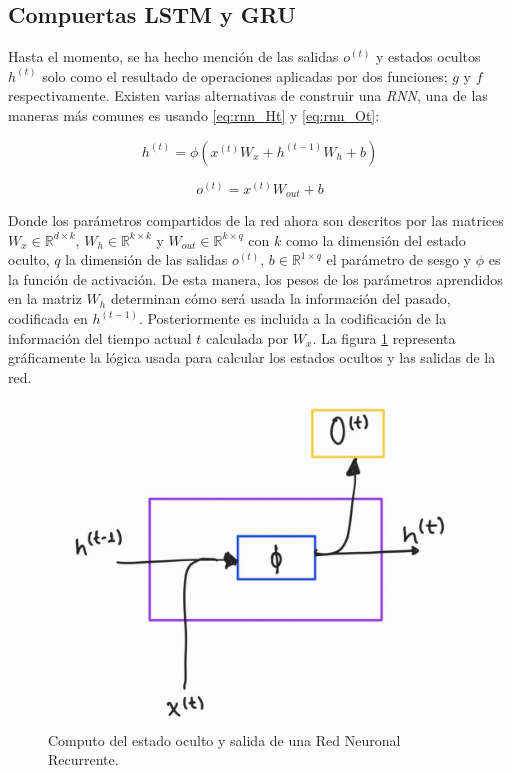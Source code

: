 \subsection{Compuertas LSTM y GRU}

Hasta el momento, se ha hecho mención de las salidas $o^{(t)}$ y estados ocultos $h^{(t)}$ solo como
el resultado de operaciones aplicadas por dos funciones; $g$ y $f$ respectivamente. Existen varias
alternativas de construir una \textit{RNN}, una de las maneras más comunes es usando
\ref{eq:rnn_Ht} y \ref{eq:rnn_Ot}:

\begin{equation}
    h^{(t)} = \phi(x^{(t)} W_{x} + h^{(t-1)} W_h + b)
    \label{eq:rnn_Ht}
\end{equation}

\begin{equation}
    o^{(t)} = x^{(t)} W_{out} + b
    \label{eq:rnn_Ot}
\end{equation}

Donde los parámetros compartidos de la red ahora son descritos por las matrices
$W_x \in \mathbb{R}^{d \times k}$, $W_h \in \mathbb{R}^{k \times k}$ y $
W_{out} \in \mathbb{R}^{k \times q}$ con $k$ como la dimensión del estado oculto, $q$ la dimensión
de las salidas $o^{(t)}$, $b \in \mathbb{R} ^ {1 \times q}$ el parámetro de sesgo y $\phi$ es la
función de activación. De esta manera, los pesos de los parámetros aprendidos en la matriz $W_h$
determinan cómo será usada la información del pasado, codificada en $h^{(t-1)}$. Posteriormente
es incluida a la codificación de la información del tiempo actual $t$ calculada por $W_x$. La figura
\ref{fig:rnn_cell} representa gráficamente la lógica usada para calcular los estados ocultos y las
salidas de la red.


\begin{figure}
\centering
\includegraphics[width=0.4 \textwidth]{Chapters/1. Transformer/Figures/rnn/rnn_cell.jpg}
\caption{Computo del estado oculto y salida de una Red Neuronal Recurrente.}
\label{fig:rnn_cell}
\end{figure}


